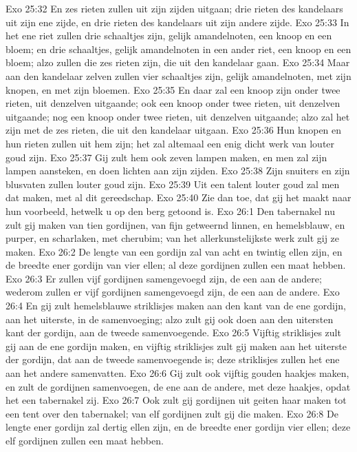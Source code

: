 Exo 25:32  En zes rieten zullen uit zijn zijden uitgaan; drie rieten des kandelaars uit zijn ene zijde, en drie rieten des kandelaars uit zijn andere zijde.
Exo 25:33  In het ene riet zullen drie schaaltjes zijn, gelijk amandelnoten, een knoop en een bloem; en drie schaaltjes, gelijk amandelnoten in een ander riet, een knoop en een bloem; alzo zullen die zes rieten zijn, die uit den kandelaar gaan.
Exo 25:34  Maar aan den kandelaar zelven zullen vier schaaltjes zijn, gelijk amandelnoten, met zijn knopen, en met zijn bloemen.
Exo 25:35  En daar zal een knoop zijn onder twee rieten, uit denzelven uitgaande; ook een knoop onder twee rieten, uit denzelven uitgaande; nog een knoop onder twee rieten, uit denzelven uitgaande; alzo zal het zijn met de zes rieten, die uit den kandelaar uitgaan.
Exo 25:36  Hun knopen en hun rieten zullen uit hem zijn; het zal altemaal een enig dicht werk van louter goud zijn.
Exo 25:37  Gij zult hem ook zeven lampen maken, en men zal zijn lampen aansteken, en doen lichten aan zijn zijden.
Exo 25:38  Zijn snuiters en zijn blusvaten zullen louter goud zijn.
Exo 25:39  Uit een talent louter goud zal men dat maken, met al dit gereedschap.
Exo 25:40  Zie dan toe, dat gij het maakt naar hun voorbeeld, hetwelk u op den berg getoond is.
Exo 26:1  Den tabernakel nu zult gij maken van tien gordijnen, van fijn getweernd linnen, en hemelsblauw, en purper, en scharlaken, met cherubim; van het allerkunstelijkste werk zult gij ze maken.
Exo 26:2  De lengte van een gordijn zal van acht en twintig ellen zijn, en de breedte ener gordijn van vier ellen; al deze gordijnen zullen een maat hebben.
Exo 26:3  Er zullen vijf gordijnen samengevoegd zijn, de een aan de andere; wederom zullen er vijf gordijnen samengevoegd zijn, de een aan de andere.
Exo 26:4  En gij zult hemelsblauwe striklisjes maken aan den kant van de ene gordijn, aan het uiterste, in de samenvoeging; alzo zult gij ook doen aan den uitersten kant der gordijn, aan de tweede samenvoegende.
Exo 26:5  Vijftig striklisjes zult gij aan de ene gordijn maken, en vijftig striklisjes zult gij maken aan het uiterste der gordijn, dat aan de tweede samenvoegende is; deze striklisjes zullen het ene aan het andere samenvatten.
Exo 26:6  Gij zult ook vijftig gouden haakjes maken, en zult de gordijnen samenvoegen, de ene aan de andere, met deze haakjes, opdat het een tabernakel zij.
Exo 26:7  Ook zult gij gordijnen uit geiten haar maken tot een tent over den tabernakel; van elf gordijnen zult gij die maken.
Exo 26:8  De lengte ener gordijn zal dertig ellen zijn, en de breedte ener gordijn vier ellen; deze elf gordijnen zullen een maat hebben.
